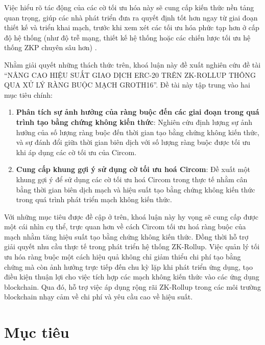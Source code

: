 Việc hiểu rõ tác động của các cờ tối ưu hóa này sẽ cung cấp kiến thức nền tảng quan trọng, giúp các nhà phát triển đưa ra quyết định tốt hơn ngay từ giai đoạn thiết kế và triển khai mạch, trước khi xem xét các tối ưu hóa phức tạp hơn ở cấp độ hệ thống (như độ trễ mạng, thiết kế hệ thống hoặc các chiến lược tối ưu hệ thống ZKP chuyên sâu hơn) \cite{liang2025sok}.

Nhằm giải quyết những thách thức trên, khoá luận này đề xuất nghiên cứu đề tài ``NÂNG CAO HIỆU SUẤT GIAO DỊCH ERC-20 TRÊN ZK-ROLLUP THÔNG QUA XỬ LÝ RÀNG BUỘC MẠCH GROTH16''. Đề tài này tập trung vào hai mục tiêu chính:
\begin{enumerate}
    \item \textbf{Phân tích sự ảnh hưởng của ràng buộc đến các giai đoạn trong quá trình tạo bằng chứng không kiến thức}: Nghiên cứu định lượng sự ảnh hưởng của số lượng ràng buộc đến thời gian tạo bằng chứng không kiến thức, và sự đánh đổi giữa thời gian biên dịch với số lượng ràng buộc được tối ưu khi áp dụng các cờ tối ưu của Circom.
    \item \textbf{Cung cấp khung gợi ý sử dụng cờ tối ưu hoá Circom}: Đề xuất một khung gợi ý để sử dụng các cờ tối ưu hoá Circom trong thực tế nhằm cân bằng thời gian biên dịch mạch và hiệu suất tạo bằng chứng không kiến thức trong quá trình phát triển mạch không kiến thức.
\end{enumerate}
Với những mục tiêu được đề cập ở trên, khoá luận này hy vọng sẽ cung cấp được một cái nhìn cụ thể, trực quan hơn về cách Circom tối ưu hoá ràng buộc của mạch nhằm tăng hiệu suất tạo bằng chứng không kiến thức. Đồng thời hỗ trợ giải quyết nhu cầu thực tế trong phát triển hệ thống ZK-Rollup. Việc quản lý tối ưu hóa ràng buộc một cách hiệu quả không chỉ giảm thiểu chi phí tạo bằng chứng mà còn ảnh hưởng trực tiếp đến chu kỳ lặp khi phát triển ứng dụng, tạo điều kiện thuận lợi cho việc tích hợp các mạch không kiến thức vào các ứng dụng blockchain. Qua đó, hỗ trợ việc áp dụng rộng rãi ZK-Rollup trong các môi trường blockchain nhạy cảm về chi phí và yêu cầu cao về hiệu suất.

\section{Mục tiêu}

